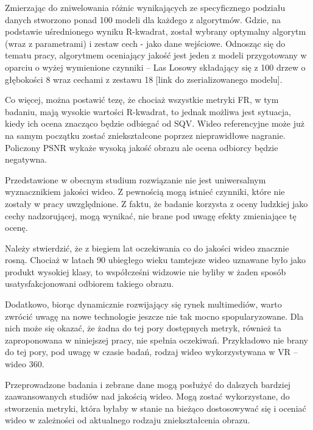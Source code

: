 Zmierzając do zniwelowania różnic wynikających ze specyficznego podziału danych stworzono ponad 100 modeli dla każdego z algorytmów. Gdzie, na podstawie uśrednionego wyniku R-kwadrat, został wybrany optymalny algorytm (wraz z parametrami) i zestaw cech - jako dane wejściowe. Odnosząc się do tematu pracy, algorytmem oceniający jakość jest jeden z modeli przygotowany w oparciu o wyżej wymienione czynniki -- Las Losowy składający się z 100 drzew o głębokości 8 wraz cechami z zestawu 18 [link do zserializowanego modelu].

Co więcej, można postawić tezę, że chociaż wszystkie metryki FR, w tym badaniu, mają wysokie wartości R-kwadrat, to jednak możliwa jest sytuacja, kiedy ich ocena znacząco będzie odbiegać od SQV. Wideo referencyjne może już na samym początku zostać zniekształcone poprzez nieprawidłowe nagranie. Policzony PSNR wykaże wysoką jakość obrazu ale ocena odbiorcy będzie negatywna.

Przedstawione w obecnym studium rozwiązanie nie jest uniwersalnym wyznacznikiem jakości wideo. Z pewnością mogą istnieć czynniki, które nie zostały w pracy uwzględnione. Z faktu, że badanie korzysta z oceny ludzkiej jako cechy nadzorującej, mogą wynikać, nie brane pod uwagę efekty zmieniające tę ocenę.

Należy stwierdzić, że z biegiem lat oczekiwania co do jakości wideo znacznie rosną. Chociaż w latach 90 ubiegłego wieku tamtejsze wideo uznawane było jako produkt wysokiej klasy, to współcześni widzowie nie byliby w żaden sposób usatysfakcjonowani odbiorem takiego obrazu. 

Dodatkowo, biorąc dynamicznie rozwijający się rynek multimediów, warto zwrócić uwagę na nowe technologie jeszcze nie tak mocno spopularyzowane. Dla nich może się okazać, że żadna do tej pory dostępnych metryk, również ta  zaproponowana w niniejszej pracy,  nie spełnia oczekiwań. Przykładowo nie brany do tej pory, pod uwagę w czasie badań, rodzaj wideo wykorzystywana w VR -- wideo 360.  

Przeprowadzone badania i zebrane dane mogą posłużyć do dalszych bardziej
zaawansowanych studiów nad jakością wideo. Mogą zostać wykorzystane, do stworzenia metryki, która byłaby w stanie na bieżąco dostosowywać się i oceniać wideo w zależności od aktualnego rodzaju zniekształcenia obrazu.


\label{cha:pierwszyDokument}










